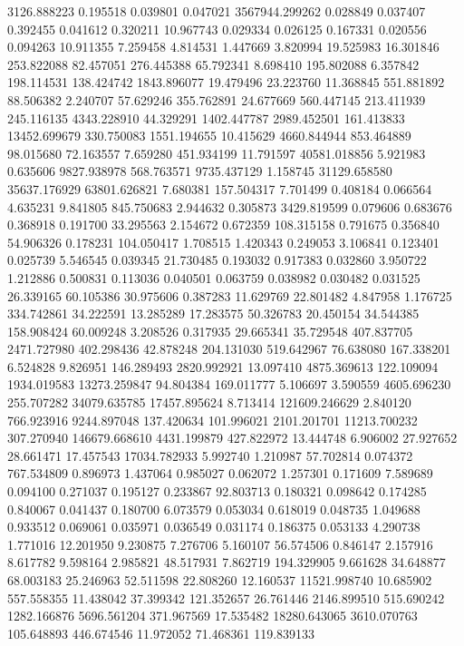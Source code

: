 3126.888223
0.195518
0.039801
0.047021
3567944.299262
0.028849
0.037407
0.392455
0.041612
0.320211
10.967743
0.029334
0.026125
0.167331
0.020556
0.094263
10.911355
7.259458
4.814531
1.447669
3.820994
19.525983
16.301846
253.822088
82.457051
276.445388
65.792341
8.698410
195.802088
6.357842
198.114531
138.424742
1843.896077
19.479496
23.223760
11.368845
551.881892
88.506382
2.240707
57.629246
355.762891
24.677669
560.447145
213.411939
245.116135
4343.228910
44.329291
1402.447787
2989.452501
161.413833
13452.699679
330.750083
1551.194655
10.415629
4660.844944
853.464889
98.015680
72.163557
7.659280
451.934199
11.791597
40581.018856
5.921983
0.635606
9827.938978
568.763571
9735.437129
1.158745
31129.658580
35637.176929
63801.626821
7.680381
157.504317
7.701499
0.408184
0.066564
4.635231
9.841805
845.750683
2.944632
0.305873
3429.819599
0.079606
0.683676
0.368918
0.191700
33.295563
2.154672
0.672359
108.315158
0.791675
0.356840
54.906326
0.178231
104.050417
1.708515
1.420343
0.249053
3.106841
0.123401
0.025739
5.546545
0.039345
21.730485
0.193032
0.917383
0.032860
3.950722
1.212886
0.500831
0.113036
0.040501
0.063759
0.038982
0.030482
0.031525
26.339165
60.105386
30.975606
0.387283
11.629769
22.801482
4.847958
1.176725
334.742861
34.222591
13.285289
17.283575
50.326783
20.450154
34.544385
158.908424
60.009248
3.208526
0.317935
29.665341
35.729548
407.837705
2471.727980
402.298436
42.878248
204.131030
519.642967
76.638080
167.338201
6.524828
9.826951
146.289493
2820.992921
13.097410
4875.369613
122.109094
1934.019583
13273.259847
94.804384
169.011777
5.106697
3.590559
4605.696230
255.707282
34079.635785
17457.895624
8.713414
121609.246629
2.840120
766.923916
9244.897048
137.420634
101.996021
2101.201701
11213.700232
307.270940
146679.668610
4431.199879
427.822972
13.444748
6.906002
27.927652
28.661471
17.457543
17034.782933
5.992740
1.210987
57.702814
0.074372
767.534809
0.896973
1.437064
0.985027
0.062072
1.257301
0.171609
7.589689
0.094100
0.271037
0.195127
0.233867
92.803713
0.180321
0.098642
0.174285
0.840067
0.041437
0.180700
6.073579
0.053034
0.618019
0.048735
1.049688
0.933512
0.069061
0.035971
0.036549
0.031174
0.186375
0.053133
4.290738
1.771016
12.201950
9.230875
7.276706
5.160107
56.574506
0.846147
2.157916
8.617782
9.598164
2.985821
48.517931
7.862719
194.329905
9.661628
34.648877
68.003183
25.246963
52.511598
22.808260
12.160537
11521.998740
10.685902
557.558355
11.438042
37.399342
121.352657
26.761446
2146.899510
515.690242
1282.166876
5696.561204
371.967569
17.535482
18280.643065
3610.070763
105.648893
446.674546
11.972052
71.468361
119.839133
